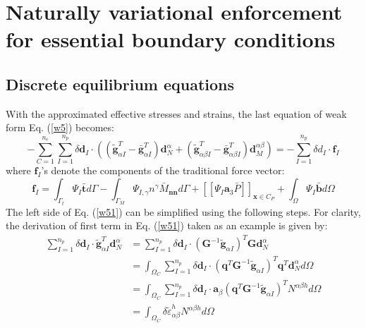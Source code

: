 \section{Naturally variational enforcement for essential boundary conditions}\label{boundary}
\subsection{Discrete equilibrium equations}
With the approximated effective stresses and strains, the last equation of weak form Eq. (\ref{w5}) becomes:
\begin{equation}\label{w51}
- \sum_{C=1}^{n_e}\sum_{I=1}^{n_p} \delta \boldsymbol d_I \cdot \left ( (\tilde{\boldsymbol g}^T_{\alpha I} - \bar{\boldsymbol g}^T_{\alpha I}) \boldsymbol d_N^{\alpha}
+ (\tilde{\boldsymbol g}^T_{\alpha\beta I} - \bar{\boldsymbol g}^T_{\alpha\beta I}) \boldsymbol d_M^{\alpha\beta} \right ) = - \sum_{I=1}^{n_p}\delta d_I \cdot \boldsymbol f_I
\end{equation}
where $\boldsymbol f_I$'s denote the components of the traditional force vector:
\begin{equation}
        \boldsymbol f_I = \int_{\Gamma_t} \Psi_I \bar{\boldsymbol t} d\Gamma - \int_{\Gamma_M} \Psi_{I,\gamma} n^\gamma \bar M_{\boldsymbol{nn}} d\Gamma + [[\Psi_I\boldsymbol a_3 \bar P]]_{\boldsymbol x\in C_P} + \int_\Omega \Psi_I \bar{\boldsymbol b} d\Omega
\end{equation}
The left side of Eq. (\ref{w51}) can be simplified using the following steps. For clarity, the derivation of first term in Eq. (\ref{w51}) taken as an example is given by:
\begin{equation}
\begin{split}
\sum_{I=1}^{n_p} \delta \boldsymbol d_I \cdot \tilde{\boldsymbol g}^T_{\alpha I} \boldsymbol d_N^\alpha 
&= \sum_{I=1}^{n_p} \delta \boldsymbol d_I \cdot (\boldsymbol G^{-1} \tilde{\boldsymbol g}_{\alpha I})^T  \boldsymbol G \boldsymbol d^\alpha_N \\
&= \int_{\Omega_C} \sum_{I=1}^{n_p} \delta \boldsymbol d_I \cdot (\boldsymbol q^T\boldsymbol G^{-1} \tilde{\boldsymbol g}_{\alpha I})^T  \boldsymbol q^T \boldsymbol d^\alpha_N d\Omega \\
&= \int_{\Omega_C} \sum_{I=1}^{n_p} \delta \boldsymbol d_I \cdot \boldsymbol a_\beta(\boldsymbol q^T\boldsymbol G^{-1} \tilde{\boldsymbol g}_{\alpha I})^T  N^{\alpha\beta h} d\Omega \\
& = \int_{\Omega_C} \delta \tilde \varepsilon_{\alpha\beta}^h N^{\alpha\beta h} d\Omega 
\end{split}
\end{equation}
